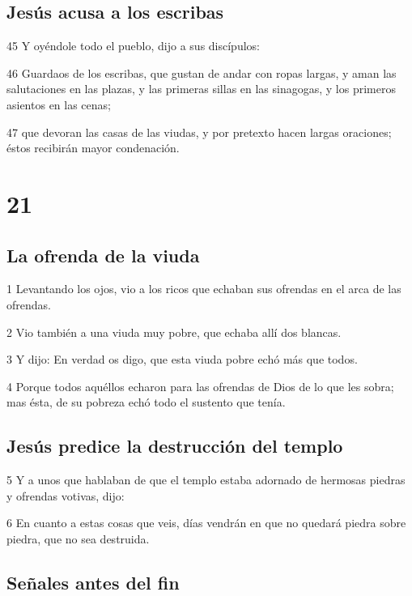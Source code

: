 \section*{Jesús acusa a los escribas}

\par 45 Y oyéndole todo el pueblo, dijo a sus discípulos:
\par 46 Guardaos de los escribas, que gustan de andar con ropas largas, y aman las salutaciones en las plazas, y las primeras sillas en las sinagogas, y los primeros asientos en las cenas;
\par 47 que devoran las casas de las viudas, y por pretexto hacen largas oraciones; éstos recibirán mayor condenación.

\chapter{21}

\section*{La ofrenda de la viuda}

\par 1 Levantando los ojos, vio a los ricos que echaban sus ofrendas en el arca de las ofrendas.
\par 2 Vio también a una viuda muy pobre, que echaba allí dos blancas.
\par 3 Y dijo: En verdad os digo, que esta viuda pobre echó más que todos.
\par 4 Porque todos aquéllos echaron para las ofrendas de Dios de lo que les sobra; mas ésta, de su pobreza echó todo el sustento que tenía.

\section*{Jesús predice la destrucción del templo}

\par 5 Y a unos que hablaban de que el templo estaba adornado de hermosas piedras y ofrendas votivas, dijo:
\par 6 En cuanto a estas cosas que veis, días vendrán en que no quedará piedra sobre piedra, que no sea destruida.

\section*{Señales antes del fin}

